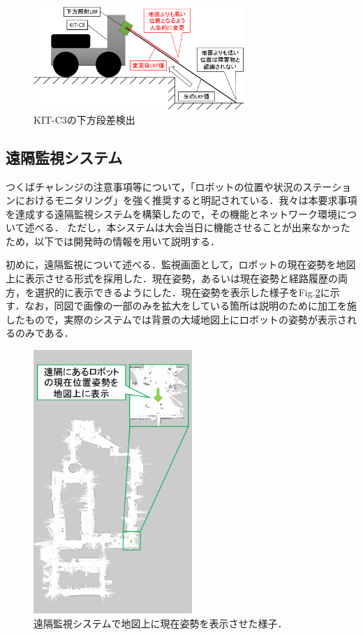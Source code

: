 \documentclass[10pt,a4paper]{jarticle}
\begin{document}
\begin{figure}
    \centering
    \includegraphics[width=8cm]{fig/png/lower_step_detector.png}
    \caption{KIT-C3の下方段差検出}
    \label{lower_step_detector}
\end{figure}

\subsection{遠隔監視システム}
つくばチャレンジの注意事項等について，「ロボットの位置や状況のステーションにおけるモニタリング」を強く推奨すると明記されている．我々は本要求事項を達成する遠隔監視システムを構築したので，その機能とネットワーク環境について述べる．
ただし，本システムは大会当日に機能させることが出来なかったため，以下では開発時の情報を用いて説明する．

初めに，遠隔監視について述べる．監視画面として，ロボットの現在姿勢を地図上に表示させる形式を採用した．現在姿勢，あるいは現在姿勢と経路履歴の両方，を選択的に表示できるようにした．現在姿勢を表示した様子をFig.\ref{monitor}に示す．なお，同図で画像の一部のみを拡大をしている箇所は説明のために加工を施したもので，実際のシステムでは背景の大域地図上にロボットの姿勢が表示されるのみである．
\begin{figure}
    \centering
    \includegraphics[width=6cm]{fig/png/monitor.png}
    \caption{遠隔監視システムで地図上に現在姿勢を表示させた様子．}
    \label{monitor}
\end{figure}
\end{document}
